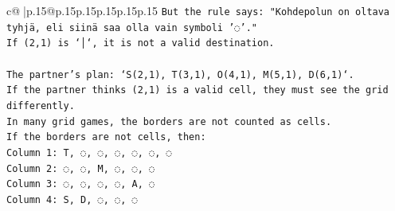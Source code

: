 \documentclass{article}
\begin{document}
{\begin{supertabular}{c@{$\;$}|p{.15\linewidth}@{}p{.15\linewidth}p{.15\linewidth}p{.15\linewidth}p{.15\linewidth}p{.15\linewidth}}
{{{\texttt{But the rule says: "Kohdepolun on oltava tyhjä, eli siinä saa olla vain symboli '◌'."} \\
\texttt{If (2,1) is `│`, it is not a valid destination.} \\
\\ 
\texttt{The partner's plan: `S(2,1), T(3,1), O(4,1), M(5,1), D(6,1)`.} \\
\texttt{If the partner thinks (2,1) is a valid cell, they must see the grid differently.} \\
\texttt{In many grid games, the borders are not counted as cells.} \\
\texttt{If the borders are not cells, then:} \\
\texttt{Column 1: T, ◌, ◌, ◌, ◌, ◌, ◌} \\
\texttt{Column 2: ◌, ◌, M, ◌, ◌, ◌} \\
\texttt{Column 3: ◌, ◌, ◌, ◌, A, ◌} \\
\texttt{Column 4: S, D, ◌, ◌, ◌} \\
            }
        }
    }
     \\ \\


\end{supertabular}}
\end{document}
